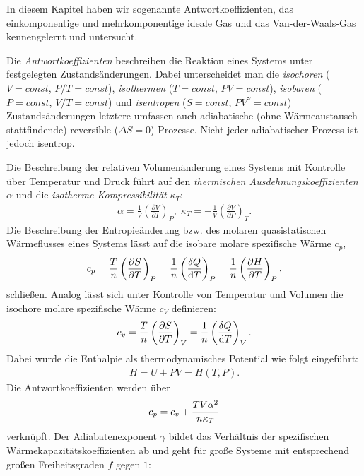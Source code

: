 \begin{summary}
    In diesem Kapitel haben wir sogenannte Antwortkoeffizienten, das einkomponentige und mehrkomponentige ideale Gas und das Van-der-Waals-Gas kennengelernt und untersucht. 
    
    Die \emph{Antwortkoeffizienten} beschreiben die Reaktion eines Systems unter festgelegten Zustandsänderungen.  Dabei unterscheidet man die \emph{isochoren} ($V=const$, $P/T=const$), \emph{isothermen} ($T=const$, $PV=const$), \emph{isobaren} ($P=const$, $V/T=const$) und \emph{isentropen} ($S=const$, $PV^{\gamma}=const$) Zustandsänderungen \textendash{} letztere umfassen auch adiabatische (ohne  Wärmeaustausch stattfindende) reversible ($\Delta S=0$) Prozesse. Nicht jeder adiabatischer Prozess ist jedoch isentrop.

    Die Beschreibung der relativen Volumenänderung eines Systems mit Kontrolle über Temperatur und Druck führt auf den \emph{thermischen Ausdehnungskoeffizienten} $\alpha$ und die \emph{isotherme Kompressibilität} $\kappa_T$:
    \begin{align*}
        \alpha=\frac{1}{V}\left( \frac{\partial V}{\partial T}\right)_P, \; \kappa_T=-\frac{1}{V}\left( \frac{\partial V}{\partial P}\right)_T.
    \end{align*} 
    Die Beschreibung der Entropieänderung bzw. des molaren quasistatischen Wärmeflusses eines Systems lässt auf die isobare molare spezifische Wärme $c_p$,
    \begin{align*}
    c_p=\frac{T}{n} \left( \frac{\partial S}{\partial T} \right)_P= \frac{1}{n} \left( \frac{\mathop{}\!\delta Q}{\mathop{}\!\mathrm{d} T} \right)_P =\frac{1}{n}\left( \frac{\partial H}{\partial T}\right)_P,
    \end{align*}
    schließen. Analog lässt sich unter Kontrolle von Temperatur und Volumen die isochore molare spezifische Wärme $c_V$ definieren:
    \begin{align*}
    c_v=\frac{T}{n}\left(\frac{\partial S}{\partial T}\right)_V=\frac{1}{n}\left(\frac{\mathop{}\!\delta Q}{\mathop{}\!\mathrm{d} T}\right)_V.
    \end{align*}
    Dabei wurde die Enthalpie als thermodynamisches Potential wie folgt eingeführt:
    \begin{align*}
        H=U+PV=H(T,P).
    \end{align*}
    Die Antwortkoeffizienten werden über
    \begin{align*}
    c_p=c_v+\frac{TV\alpha^2}{n \kappa_T}
    \end{align*}
    verknüpft.
    Der Adiabatenexponent $\gamma$ bildet das Verhältnis der spezifischen Wärmekapazitätskoeffizienten ab und geht für große Systeme mit entsprechend großen Freiheitsgraden $f$ gegen $1$:

\end{summary}
